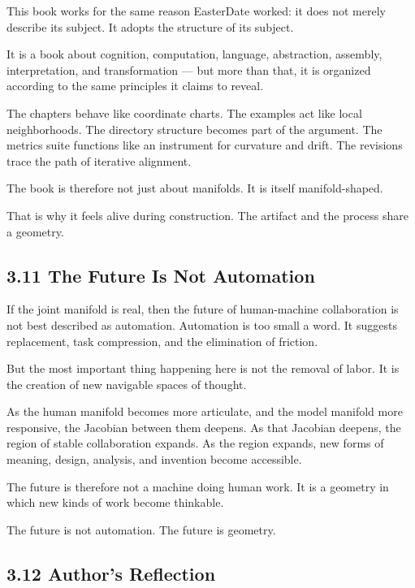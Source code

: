 \documentclass[
]{article}
\begin{document}
This book works for the same reason EasterDate worked: it does not
merely describe its subject. It adopts the structure of its subject.

It is a book about cognition, computation, language, abstraction,
assembly, interpretation, and transformation --- but more than that, it
is organized according to the same principles it claims to reveal.

The chapters behave like coordinate charts. The examples act like local
neighborhoods. The directory structure becomes part of the argument. The
metrics suite functions like an instrument for curvature and drift. The
revisions trace the path of iterative alignment.

The book is therefore not just about manifolds. It is itself
manifold-shaped.

That is why it feels alive during construction. The artifact and the
process share a geometry.

\hypertarget{the-future-is-not-automation}{%
\subsection{3.11 The Future Is Not
Automation}\label{the-future-is-not-automation}}

If the joint manifold is real, then the future of human-machine
collaboration is not best described as automation. Automation is too
small a word. It suggests replacement, task compression, and the
elimination of friction.

But the most important thing happening here is not the removal of labor.
It is the creation of new navigable spaces of thought.

As the human manifold becomes more articulate, and the model manifold
more responsive, the Jacobian between them deepens. As that Jacobian
deepens, the region of stable collaboration expands. As the region
expands, new forms of meaning, design, analysis, and invention become
accessible.

The future is therefore not a machine doing human work. It is a geometry
in which new kinds of work become thinkable.

The future is not automation. The future is geometry.

\hypertarget{authors-reflection}{%
\subsection{3.12 Author's Reflection}\label{authors-reflection}}
\end{document}
